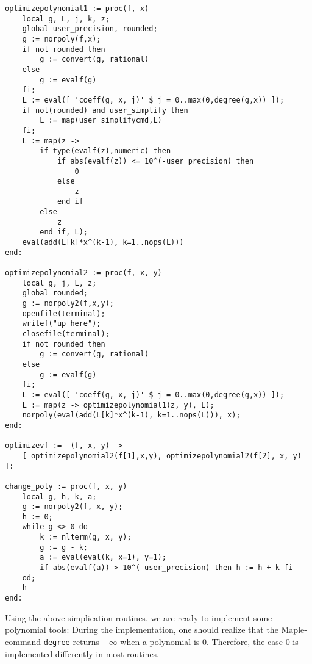 \documentclass[a4paper,10pt]{article}
\begin{document}
\begin{lstlisting}[name=tools]
optimizepolynomial1 := proc(f, x)
    local g, L, j, k, z;
    global user_precision, rounded;
    g := norpoly(f,x);
    if not rounded then
        g := convert(g, rational)
    else
        g := evalf(g)
    fi;
    L := eval([ 'coeff(g, x, j)' $ j = 0..max(0,degree(g,x)) ]);
    if not(rounded) and user_simplify then
        L := map(user_simplifycmd,L)
    fi;
    L := map(z ->
        if type(evalf(z),numeric) then
            if abs(evalf(z)) <= 10^(-user_precision) then
                0
            else
                z
            end if
        else
            z
        end if, L);
    eval(add(L[k]*x^(k-1), k=1..nops(L)))
end:

optimizepolynomial2 := proc(f, x, y)
    local g, j, L, z;
    global rounded;
    g := norpoly2(f,x,y);
    openfile(terminal);
    writef("up here");
    closefile(terminal);
    if not rounded then
        g := convert(g, rational)
    else
        g := evalf(g)
    fi;
    L := eval([ 'coeff(g, x, j)' $ j = 0..max(0,degree(g,x)) ]);
    L := map(z -> optimizepolynomial1(z, y), L);
    norpoly(eval(add(L[k]*x^(k-1), k=1..nops(L))), x);
end:

optimizevf :=  (f, x, y) ->
    [ optimizepolynomial2(f[1],x,y), optimizepolynomial2(f[2], x, y) ]:

change_poly := proc(f, x, y)
    local g, h, k, a;
    g := norpoly2(f, x, y);
    h := 0;
    while g <> 0 do
        k := nlterm(g, x, y);
        g := g - k;
        a := eval(eval(k, x=1), y=1);
        if abs(evalf(a)) > 10^(-user_precision) then h := h + k fi
    od;
    h
end:

\end{lstlisting}

Using the above simplication routines, we are ready to implement some polynomial tools:
During the implementation, one should realize that the Maple-command \verb+degree+ returns $-\infty$ when
a polynomial is $0$.  Therefore, the case $0$ is implemented differently in most routines.
\end{document}
